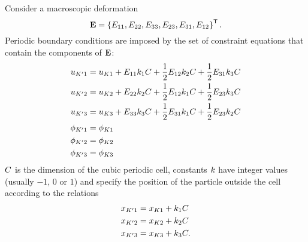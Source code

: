 Consider a macroscopic deformation
\begin{equation}
	\macroscopicDeformationVector = \left\{
		\macroscopicDeformation_{11},
		\macroscopicDeformation_{22},
		\macroscopicDeformation_{33},
		\macroscopicDeformation_{23},
		\macroscopicDeformation_{31},
		\macroscopicDeformation_{12}
	\right\}\T
	.
\end{equation}
Periodic boundary conditions are imposed by the set of constraint equations that contain the components of $\macroscopicDeformationVector$:
\begin{equation}
	\begin{aligned}
		u_{K'1} &= u_{K1} + E_{11}k_1C + \frac{1}{2}E_{12}k_2C + \frac{1}{2}E_{31}k_3C
		\\
		u_{K'2} &= u_{K2} + E_{22}k_2C + \frac{1}{2}E_{12}k_1C + \frac{1}{2}E_{23}k_3C
		\\
		u_{K'3} &= u_{K3} + E_{33}k_3C + \frac{1}{2}E_{31}k_1C + \frac{1}{2}E_{23}k_2C
		\\
		\phi_{K'1} &= \phi_{K1} \\
		\phi_{K'2} &= \phi_{K2} \\
		\phi_{K'3} &= \phi_{K3} \\
	\end{aligned}
	\label{eqMacroPropertiesElasticFemPeriDspl}
\end{equation}
$C$ is the dimension of the cubic periodic cell, constants $k$ have integer values (usually $-1$, $0$ or $1$) and specify the position of the particle outside the cell according to the relations
\begin{equation}
	\begin{aligned}
		x_{K'1} &= x_{K1} + k_1C
		\\
		x_{K'2} &= x_{K2} + k_2C
		\\
		x_{K'3} &= x_{K3} + k_3C
		.
	\end{aligned}
\end{equation}
